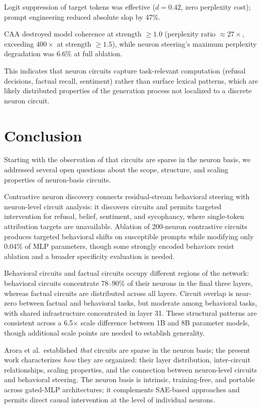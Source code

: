 \documentclass[11pt]{article}
\begin{document}
Logit suppression of target tokens was effective ($d = 0.42$, zero perplexity cost); prompt engineering reduced absolute slop by 47\%.

CAA destroyed model coherence at strength $\geq 1.0$ (perplexity ratio $\approx 27\times$, exceeding $400\times$ at strength $\geq 1.5$), while neuron steering's maximum perplexity degradation was 6.6\% at full ablation.

This indicates that neuron circuits capture task-relevant computation (refusal decisions, factual recall, sentiment) rather than surface lexical patterns, which are likely distributed properties of the generation process not localized to a discrete neuron circuit.

\section{Conclusion}
\label{sec:conclusion}

Starting with the observation of \citet{arora2025circuits} that circuits are sparse in the neuron basis, we addressed several open questions about the scope, structure, and scaling properties of neuron-basis circuits.

Contrastive neuron discovery connects residual-stream behavioral steering with neuron-level circuit analysis: it discovers circuits and permits targeted intervention for refusal, belief, sentiment, and sycophancy, where single-token attribution targets are unavailable.
Ablation of 200-neuron contrastive circuits produces targeted behavioral shifts on susceptible prompts while modifying only 0.04\% of MLP parameters, though some strongly encoded behaviors resist ablation and a broader specificity evaluation is needed.

Behavioral circuits and factual circuits occupy different regions of the network: behavioral circuits concentrate 78--90\% of their neurons in the final three layers, whereas factual circuits are distributed across all layers.
Circuit overlap is near-zero between factual and behavioral tasks, but moderate among behavioral tasks, with shared infrastructure concentrated in layer 31.
These structural patterns are consistent across a 6.5$\times$ scale difference between 1B and 8B parameter models, though additional scale points are needed to establish generality.

Arora et al.\ established \emph{that} circuits are sparse in the neuron basis; the present work characterizes \emph{how} they are organized: their layer distribution, inter-circuit relationships, scaling properties, and the connection between neuron-level circuits and behavioral steering.
The neuron basis is intrinsic, training-free, and portable across gated-MLP architectures; it complements SAE-based approaches and permits direct causal intervention at the level of individual neurons.
\end{document}
